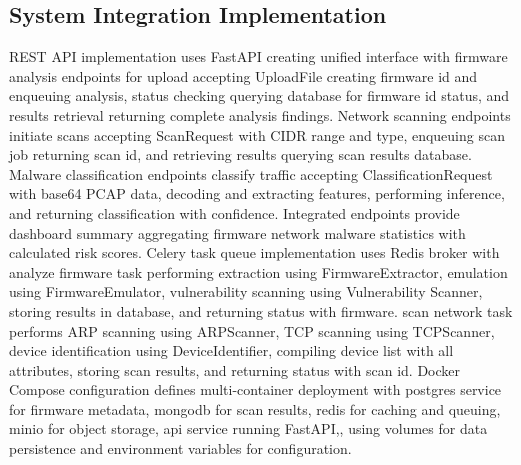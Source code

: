 \subsection{System Integration Implementation}

REST API implementation uses FastAPI creating unified interface with firmware analysis endpoints for upload accepting UploadFile creating firmware id and enqueuing analysis, status checking querying database for firmware id status, and results retrieval returning complete analysis findings. Network scanning endpoints initiate scans accepting ScanRequest with CIDR range and type, enqueuing scan job returning scan id, and retrieving results querying scan results database. Malware classification endpoints classify traffic accepting ClassificationRequest with base64 PCAP data, decoding and extracting features, performing inference, and returning classification with confidence. Integrated endpoints provide dashboard summary aggregating firmware network malware statistics with calculated risk scores. Celery task queue implementation uses Redis broker with analyze firmware task performing extraction using FirmwareExtractor, emulation using FirmwareEmulator, vulnerability scanning using Vulnerability Scanner, storing results in database, and returning status with firmware. scan network task performs ARP scanning using ARPScanner, TCP scanning using TCPScanner, device identification using DeviceIdentifier, compiling device list with all attributes, storing scan results, and returning status with scan id. Docker Compose configuration defines multi-container deployment with postgres service for firmware metadata, mongodb for scan results, redis for caching and queuing, minio for object storage, api service running FastAPI,, using volumes for data persistence and environment variables for configuration.